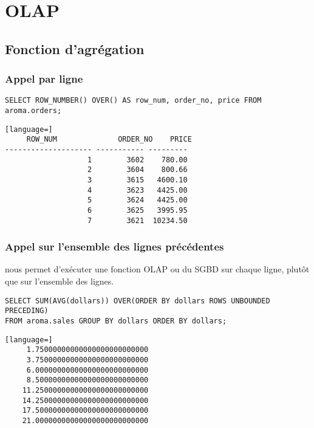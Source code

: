 \section{OLAP}

\subsection{Fonction d'agrégation}

\subsubsection{Appel par ligne}
\begin{lstlisting}[title=Afficher le numéro de ligne de chaque entrée.]
     SELECT ROW_NUMBER() OVER() AS row_num, order_no, price FROM aroma.orders;
\end{lstlisting}

\begin{lstlisting}[language=]
     ROW_NUM              ORDER_NO    PRICE    
-------------------- ----------- ---------
                   1        3602    780.00
                   2        3604    800.66
                   3        3615   4600.10
                   4        3623   4425.00
                   5        3624   4425.00
                   6        3625   3995.95
                   7        3621  10234.50
\end{lstlisting}

\subsubsection{Appel sur l'ensemble des lignes précédentes}
 nous permet d'exécuter une fonction OLAP ou du SGBD sur chaque ligne, plutôt que sur l'ensemble des lignes.

\begin{lstlisting}[title=Faire la somme des moyennes au-dessus de la ligne.]
SELECT SUM(AVG(dollars)) OVER(ORDER BY dollars ROWS UNBOUNDED PRECEDING)
FROM aroma.sales GROUP BY dollars ORDER BY dollars;
\end{lstlisting}

\begin{lstlisting}[language=]
     1.75000000000000000000000000
     3.75000000000000000000000000
     6.00000000000000000000000000
     8.50000000000000000000000000
    11.25000000000000000000000000
    14.25000000000000000000000000
    17.50000000000000000000000000
    21.00000000000000000000000000
\end{lstlisting}


